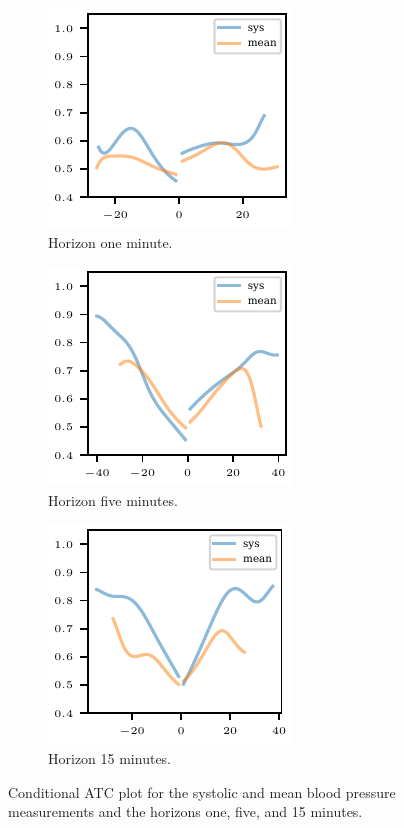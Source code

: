 \documentclass[pdflatex]{sn-jnl}
\theoremstyle{plain}%
\theoremstyle{definition}
\begin{document}
\begin{figure}
    \centering
    \begin{subfigure}[t]{.32\textwidth}
        \includegraphics{plots/mimic/cond_prob_diff_nbp_abp_lag1}
        \caption{Horizon one minute.}
    \end{subfigure}\hspace{0.01\textwidth}
    \begin{subfigure}[t]{.32\textwidth}
        \includegraphics{plots/mimic/cond_prob_diff_nbp_abp_lag5}
        \caption{Horizon five minutes.}
    \end{subfigure}\hspace{0.01\textwidth}
    \begin{subfigure}[t]{.32\textwidth}
        \includegraphics{plots/mimic/cond_prob_diff_nbp_abp_lag15}
        \caption{Horizon 15 minutes.}
    \end{subfigure}\hspace{0.01\textwidth}
    \caption{Conditional ATC plot for the systolic and mean blood pressure measurements and the horizons one, five, and 15 minutes. }
    \label{fig:app-mimic-cond-prob}
\end{figure}
\end{document}
